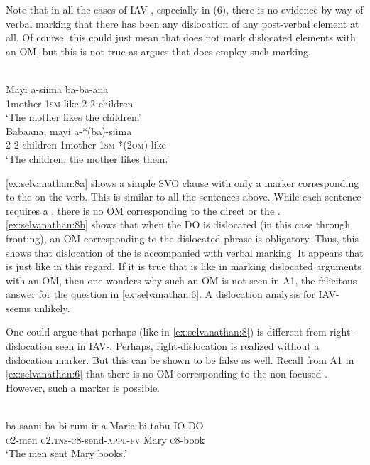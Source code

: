\documentclass[output=paper
,newtxmath
,modfonts
,nonflat]{langsci/langscibook}
\begin{document}
Note that in all the cases of IAV , especially in (6), there is no evidence by way of verbal marking that there has been any dislocation of any post-verbal element at all. Of course, this could just mean that  does not mark dislocated elements with an OM, but this is not true as \citet{Sikuku2012} argues that  does employ such marking.

\ea\label{ex:selvanathan:8}
 \citep[8]{Sikuku2012}\\
\ea\label{ex:selvanathan:8a}
\gll Mayi     a-siima   ba-ba-ana\\
1mother   \textsc{1sm}{}-like   2-2-children \\
\glt `The mother likes the children.' \\

\ex\label{ex:selvanathan:8b}
\gll Babaana,   mayi     a-*(ba)-siima\\
	2-2-children   1mother   \textsc{1sm}{}-*(\textsc{2om})-like \\
\glt `The children, the mother likes them.' 
\z
\z

\ref{ex:selvanathan:8a} shows a simple SVO clause with only a marker corresponding to the  on the verb. This is similar to all the  sentences above. While each sentence requires a , there is no OM corresponding to the direct or the . \ref{ex:selvanathan:8b} shows that when the DO is dislocated (in this case through fronting), an OM corresponding to the dislocated phrase is obligatory. Thus, this shows that dislocation of the  is accompanied with verbal marking. It appears that  is just like  in this regard. If it is true that  is like  in marking dislocated arguments with an OM, then one wonders why such an OM is not seen in A1, the felicitous answer for the question in \ref{ex:selvanathan:6}. A dislocation analysis for  IAV- seems unlikely. 

One could argue that perhaps  (like in \ref{ex:selvanathan:8}) is different from right-dislocation seen in IAV-. Perhaps, right-dislocation is realized without a dislocation marker. But this can be shown to be false as well. Recall from A1 in \ref{ex:selvanathan:6} that there is no OM corresponding to the non-focused . However, such a marker is possible. 

\ea\label{ex:selvanathan:9}
\\
\gll ba-saani    ba-bi-rum-ir-a           Maria   bi-tabu    IO-DO \\
\textsc{c}2-men      \textsc{c}2.\textsc{tns}{}-\textsc{c}8-send-\textsc{appl}{}-\textsc{fv}  Mary     \textsc{c}8-book  \\ 
\glt `The men sent Mary books.'
\z
\end{document}
